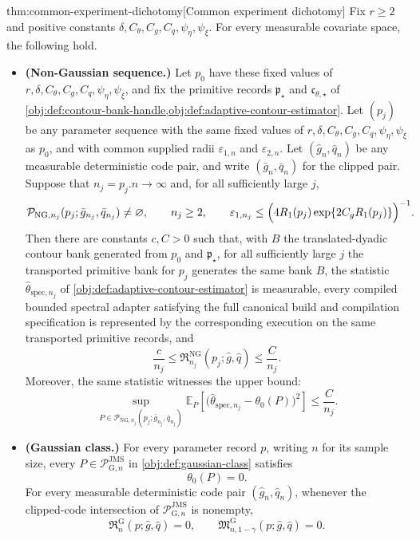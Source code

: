 \begin{theoremv}{thm:common-experiment-dichotomy}[Common experiment dichotomy]
Fix \(r\ge 2\) and positive constants \(\delta,C_{\theta},C_g,C_q,\psi_{\eta},\psi_{\xi}\). For every measurable covariate space, the following hold.

\begin{itemize}
\item \textbf{(Non-Gaussian sequence.)} Let \(p_0\) have these fixed values of \(r,\delta,C_{\theta},C_g,C_q,\psi_{\eta},\psi_{\xi}\), and fix the primitive records \(\mathfrak p_{\star}\) and \(\mathfrak c_{\theta,\star}\) of \cref{obj:def:contour-bank-handle,obj:def:adaptive-contour-estimator}. Let \((p_j)\) be any parameter sequence with the same fixed values of \(r,\delta,C_{\theta},C_g,C_q,\psi_{\eta},\psi_{\xi}\) as \(p_0\), and with common supplied radii \(\varepsilon_{1,n}\) and \(\varepsilon_{2,n}\). Let \((\widehat g_n,\widehat q_n)\) be any measurable deterministic code pair, and write \((\bar g_n,\bar q_n)\) for the clipped pair. Suppose that \(n_j=p_j.n\to\infty\) and, for all sufficiently large \(j\),
\[
\mathcal P_{\mathrm{NG},n_j}(p_j;\bar g_{n_j},\bar q_{n_j})\neq\varnothing,\qquad
n_j\ge 2,\qquad
\varepsilon_{1,n_j}\le
\Bigl(4R_1(p_j)\exp\{2C_gR_1(p_j)\}\Bigr)^{-1}.
\]
Then there are constants \(c,C>0\) such that, with
\(B\) the translated-dyadic contour bank generated from \(p_0\) and \(\mathfrak p_{\star}\), for all sufficiently large \(j\) the transported primitive bank for \(p_j\) generates the same bank \(B\), the statistic \(\widehat\theta_{\mathrm{spec},n_j}\) of \cref{obj:def:adaptive-contour-estimator} is measurable, every compiled bounded spectral adapter satisfying the full canonical build and compilation specification is represented by the corresponding execution on the same transported primitive records, and
\[
\frac{c}{n_j}\le
\mathfrak R_{n_j}^{\mathrm{NG}}(p_j;\widehat g,\widehat q)
\le
\frac{C}{n_j}.
\]
Moreover, the same statistic witnesses the upper bound:
\[
\sup_{P\in \mathcal P_{\mathrm{NG},n_j}(p_j;\bar g_{n_j},\bar q_{n_j})}
\mathbb E_P\!\left[
\bigl(\widehat\theta_{\mathrm{spec},n_j}-\theta_0(P)\bigr)^2
\right]
\le
\frac{C}{n_j}.
\]

\item \textbf{(Gaussian class.)} For every parameter record \(p\), writing \(n\) for its sample size, every \(P\in\mathcal P_{\mathrm G,n}^{\mathrm{JMS}}\) in \cref{obj:def:gaussian-class} satisfies
\[
\theta_0(P)=0.
\]
For every measurable deterministic code pair \((\widehat g_n,\widehat q_n)\), whenever the clipped-code intersection of \(\mathcal P_{\mathrm G,n}^{\mathrm{JMS}}\) is nonempty,
\[
\mathfrak R_{n}^{\mathrm G}(p;\widehat g,\widehat q)=0,
\qquad
\mathfrak M_{n,1-\gamma}^{\mathrm G}(p;\widehat g,\widehat q)=0.
\]
\end{itemize}
\end{theoremv}

